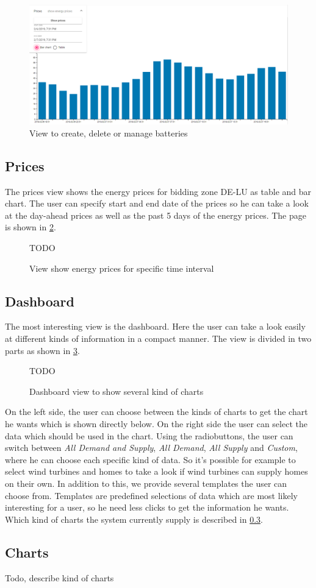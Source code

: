 \begin{figure}[!h]
    \centering
    \includegraphics[width=1.00\textwidth]{../figures/batteries.PNG}
    \caption{View to create, delete or manage batteries}
    \label{fig:batteries}
\end{figure}



\subsection{Prices}
The prices view shows the energy prices for bidding zone DE-LU as table and bar chart.
The user can specify start and end date of the prices so he can take a look at the day-ahead prices as well as the past 5 days of the energy prices.
The page is shown in \cref{fig:prices}.

\begin{figure}[!h]
    \centering
    TODO%
    \caption{View show energy prices for specific time interval}
    \label{fig:prices}
\end{figure}

\subsection{Dashboard}
The most interesting view is the dashboard.
Here the user can take a look easily at different kinds of information in a compact manner.
The view is divided in two parts as shown in \cref{fig:dashboard}.

\begin{figure}[!h]
    \centering
    TODO%
    \caption{Dashboard view to show several kind of charts}
    \label{fig:dashboard}
\end{figure}

On the left side, the user can choose between the kinds of charts to get the chart he wants which is shown directly below.
On the right side the user can select the data which should be used in the chart.
Using the radiobuttons, the user can switch between \textit{All Demand and Supply}, \textit{All Demand}, \textit{All Supply} and \textit{Custom}, where he can choose each specific kind of data.
So it's possible for example to select wind turbines and homes to take a look if wind turbines can supply homes on their own.
In addition to this, we provide several templates the user can choose from.
Templates are predefined selections of data which are most likely interesting for a user, so he need less clicks to get the information he wants.
Which kind of charts the system currently supply is described in \cref{sec:charts}.

\subsection{Charts}\label{sec:charts}
Todo, describe kind of charts